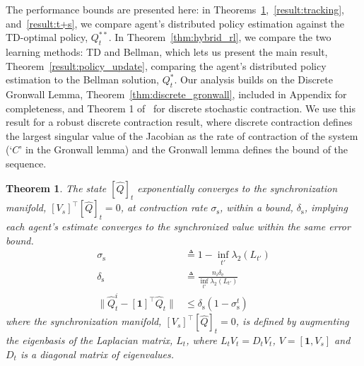 \documentclass[journal]{IEEEtran}
\newtheorem{theorem}{Theorem}
\begin{document}
The performance bounds are presented here: in Theorems~\ref{result:synch},~\ref{result:tracking}, and~\ref{result:t+s}, we compare agent's distributed policy estimation against the TD-optimal policy, $Q_t^{**}$. In Theorem~\ref{thm:hybrid_rl}, we compare the two learning methods: TD and Bellman, which lets us present the main result, Theorem~\ref{result:policy_update}, comparing the agent's distributed policy estimation to the Bellman solution, $Q_t^*$. Our analysis builds on the Discrete Gronwall Lemma, Theorem~\ref{thm:discrete_gronwall}, included in Appendix for completeness, and Theorem 1 of~\cite{Pham08} for discrete stochastic contraction. We use this result for a robust discrete contraction result, where  discrete contraction defines the largest singular value of the Jacobian as the rate of contraction of the system (`$C$' in the Gronwall lemma) and the Gronwall lemma defines the bound of the sequence. 

\begin{theorem}
    \label{result:synch}
    The state $[\hat{Q}]_t$ exponentially converges to the synchronization manifold, $[V_s]^\intercal [\hat{Q}]_t = 0$, at contraction rate $\sigma_\mathrm{s}$, within a bound, $\delta_\mathrm{s}$, implying each agent's estimate converges to the synchronized value within the same error bound. 
    \begin{align*}
        \sigma_\mathrm{s} &\triangleq 1 - \inf_{t'} \lambda_2(L_{t'})  \\
        \delta_\mathrm{s} & \triangleq \frac{ n_i \delta_\mathrm{e}}{ \inf_{t'} \lambda_2(L_{t'})} \\ 
        \| \hat{Q}_t^i - [\boldsymbol{1}]^\intercal \hat{Q}_t\| &\leq \delta_\mathrm{s}( 1 - \sigma_\mathrm{s}^t) 
    \end{align*}
    where the synchronization manifold, $[V_s]^\intercal [\hat{Q}]_t = 0$, is defined by augmenting the eigenbasis of the Laplacian matrix, $L_t$, where $L_t V_t = D_t V_t$, $V = [ \boldsymbol{1}, V_s]$ and $D_t$ is a diagonal matrix of eigenvalues. 
\end{theorem}
\end{document}
